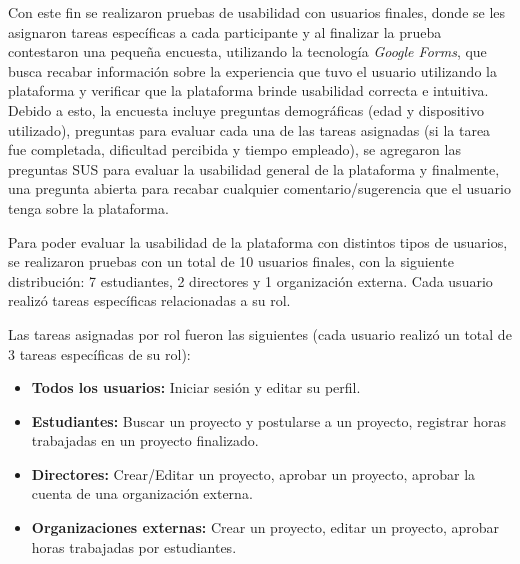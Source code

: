 Con este fin se realizaron pruebas de usabilidad con usuarios finales, donde se les asignaron tareas específicas a cada participante y al
finalizar la prueba contestaron una pequeña encuesta, utilizando la tecnología \textit{Google Forms}, que busca recabar información sobre
la experiencia que tuvo el usuario utilizando la plataforma y verificar que la plataforma brinde usabilidad correcta e intuitiva.
Debido a esto, la encuesta incluye preguntas demográficas (edad y dispositivo utilizado), preguntas para evaluar cada una de las tareas
asignadas (si la tarea fue completada, dificultad percibida y tiempo empleado), se agregaron las preguntas SUS para evaluar la usabilidad
general de la plataforma y finalmente, una pregunta abierta para recabar cualquier comentario/sugerencia que el usuario tenga sobre la plataforma.

Para poder evaluar la usabilidad de la plataforma con distintos tipos de usuarios, se realizaron pruebas con un total de 10 usuarios
finales, con la siguiente distribución: 7 estudiantes, 2 directores y 1 organización externa. Cada usuario realizó tareas específicas
relacionadas a su rol.

Las tareas asignadas por rol fueron las siguientes (cada usuario realizó un total de 3 tareas específicas de su rol):
\begin{itemize}
        \item \textbf{Todos los usuarios:} Iniciar sesión y editar su perfil.
        \item \textbf{Estudiantes:} Buscar un proyecto y postularse a un proyecto, registrar horas trabajadas en un proyecto finalizado.
        \item \textbf{Directores:} Crear/Editar un proyecto, aprobar un proyecto, aprobar la cuenta de una organización externa.
        \item \textbf{Organizaciones externas:} Crear un proyecto, editar un proyecto, aprobar horas trabajadas por estudiantes.
\end{itemize}

